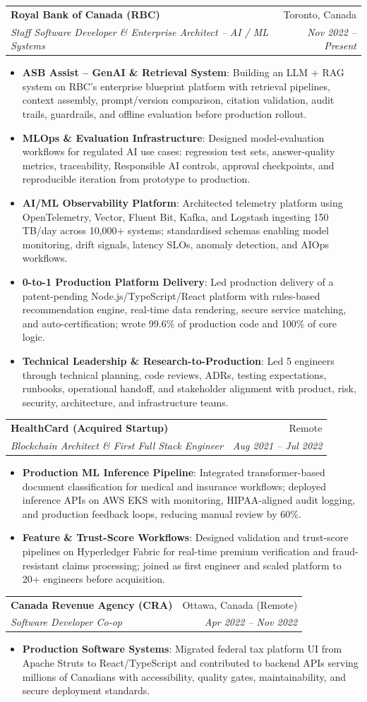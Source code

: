 \documentclass[letterpaper,9.5pt]{article}
\makeatletter
\newcommand{\resumeItem}[2]{\item\small{\textbf{#1}{: #2 \vspace{-2pt}}}}
\newcommand{\resumeSubheading}[4]{\vspace{-2pt}\item\begin{tabular*}{0.97\textwidth}{l@{\extracolsep{\fill}}r}\textbf{#1} & #2 \\\textit{\small#3} & \textit{\small #4} \\\end{tabular*}\vspace{-6pt}}
\newcommand{\resumeItemListStart}{\begin{itemize}}
\newcommand{\resumeItemListEnd}{\end{itemize}\vspace{-6pt}}
\makeatother
\begin{document}
  \resumeSubheading
    {Royal Bank of Canada (RBC)}{Toronto, Canada}
    {Staff Software Developer \& Enterprise Architect -- AI / ML Systems}{Nov 2022 -- Present}
  \resumeItemListStart
    \resumeItem{ASB Assist -- GenAI \& Retrieval System}
      {Building an LLM + RAG system on RBC's enterprise blueprint platform with retrieval pipelines, context assembly, prompt/version comparison, citation validation, audit trails, guardrails, and offline evaluation before production rollout.}
    \resumeItem{MLOps \& Evaluation Infrastructure}
      {Designed model-evaluation workflows for regulated AI use cases: regression test sets, answer-quality metrics, traceability, Responsible AI controls, approval checkpoints, and reproducible iteration from prototype to production.}
    \resumeItem{AI/ML Observability Platform}
      {Architected telemetry platform using OpenTelemetry, Vector, Fluent Bit, Kafka, and Logstash ingesting 150\,TB/day across 10,000+ systems; standardised schemas enabling model monitoring, drift signals, latency SLOs, anomaly detection, and AIOps workflows.}
    \resumeItem{0-to-1 Production Platform Delivery}
      {Led production delivery of a patent-pending Node.js/TypeScript/React platform with rules-based recommendation engine, real-time data rendering, secure service matching, and auto-certification; wrote 99.6\% of production code and 100\% of core logic.}
    \resumeItem{Technical Leadership \& Research-to-Production}
      {Led 5 engineers through technical planning, code reviews, ADRs, testing expectations, runbooks, operational handoff, and stakeholder alignment with product, risk, security, architecture, and infrastructure teams.}
  \resumeItemListEnd

  \resumeSubheading
    {HealthCard (Acquired Startup)}{Remote}
    {Blockchain Architect \& First Full Stack Engineer}{Aug 2021 -- Jul 2022}
  \resumeItemListStart
    \resumeItem{Production ML Inference Pipeline}
      {Integrated transformer-based document classification for medical and insurance workflows; deployed inference APIs on AWS EKS with monitoring, HIPAA-aligned audit logging, and production feedback loops, reducing manual review by 60\%.}
    \resumeItem{Feature \& Trust-Score Workflows}
      {Designed validation and trust-score pipelines on Hyperledger Fabric for real-time premium verification and fraud-resistant claims processing; joined as first engineer and scaled platform to 20+ engineers before acquisition.}
  \resumeItemListEnd

  \resumeSubheading
    {Canada Revenue Agency (CRA)}{Ottawa, Canada (Remote)}
    {Software Developer Co-op}{Apr 2022 -- Nov 2022}
  \resumeItemListStart
    \resumeItem{Production Software Systems}
      {Migrated federal tax platform UI from Apache Struts to React/TypeScript and contributed to backend APIs serving millions of Canadians with accessibility, quality gates, maintainability, and secure deployment standards.}
  \resumeItemListEnd
\end{document}
